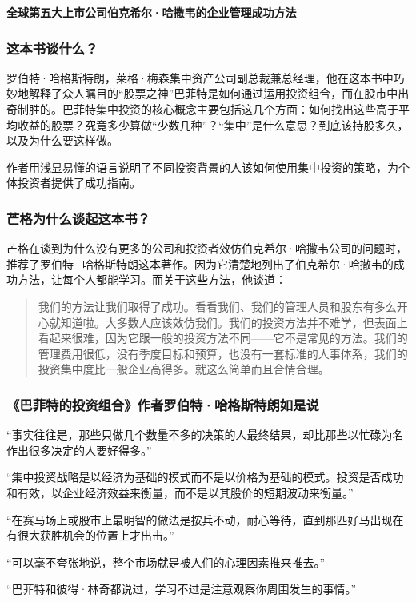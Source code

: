 \cleardoublepage
{}


\begin{BookSummaryBox}
\textbf{全球第五大上市公司伯克希尔·哈撒韦的企业管理成功方法}
\par
\end{BookSummaryBox}

\subsubsection*{这本书谈什么？}

罗伯特·哈格斯特朗，莱格·梅森集中资产公司副总裁兼总经理，他在这本书中巧妙地解释了众人瞩目的“股票之神”巴菲特是如何通过运用投资组合，而在股市中出奇制胜的。巴菲特集中投资的核心概念主要包括这几个方面：如何找出这些高于平均收益的股票？究竟多少算做“少数几种”？“集中”是什么意思？到底该持股多久，以及为什么要这样做。
\par

作者用浅显易懂的语言说明了不同投资背景的人该如何使用集中投资的策略，为个体投资者提供了成功指南。
\par

\subsubsection*{芒格为什么谈起这本书？}

芒格在谈到为什么没有更多的公司和投资者效仿伯克希尔·哈撒韦公司的问题时，推荐了罗伯特·哈格斯特朗这本著作。因为它清楚地列出了伯克希尔·哈撒韦的成功方法，让每个人都能学习。而关于这些方法，他谈道：
\par

\begin{quotation}
我们的方法让我们取得了成功。看看我们、我们的管理人员和股东有多么开心就知道啦。大多数人应该效仿我们。我们的投资方法并不难学，但表面上看起来很难，因为它跟一般的投资方法不同——它不是常见的方法。我们的管理费用很低，没有季度目标和预算，也没有一套标准的人事体系，我们的投资集中度比一般企业高得多。就这么简单而且合情合理。
\par
\end{quotation}

\subsubsection*{《巴菲特的投资组合》作者罗伯特·哈格斯特朗如是说}

“事实往往是，那些只做几个数量不多的决策的人最终结果，却比那些以忙碌为名作出很多决定的人要好得多。”
\par

“集中投资战略是以经济为基础的模式而不是以价格为基础的模式。投资是否成功和有效，以企业经济效益来衡量，而不是以其股价的短期波动来衡量。”
\par

“在赛马场上或股市上最明智的做法是按兵不动，耐心等待，直到那匹好马出现在有很大获胜机会的位置上才出击。”
\par

“可以毫不夸张地说，整个市场就是被人们的心理因素推来推去。”
\par

“巴菲特和彼得·林奇都说过，学习不过是注意观察你周围发生的事情。”
\par
